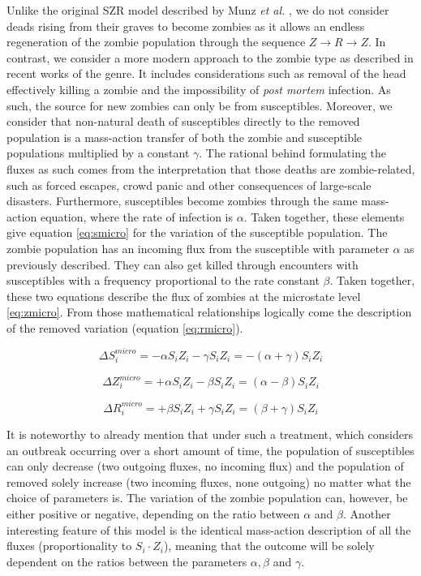\documentclass[11pt]{article} %
\begin{document}
Unlike the original SZR model described by Munz \textit{et al.} \cite{munz2009zombies}, we do not consider deads rising from their graves to become zombies as it allows an endless regeneration of the zombie population through the sequence $Z\rightarrow R\rightarrow Z$. In contrast, we consider a more modern approach to the zombie type as described in recent works of the genre. It includes considerations such as removal of the head effectively killing a zombie and the impossibility of \textit{post mortem} infection. As such, the source for new zombies can only be from susceptibles.  Moreover, we consider that non-natural death of susceptibles directly to the removed population is a mass-action transfer of both the zombie and susceptible populations multiplied by a constant $\gamma$. The rational behind formulating the fluxes as such comes from the interpretation that those deaths are zombie-related, such as forced escapes, crowd panic and other consequences of large-scale disasters. Furthermore, susceptibles become zombies through the same mass-action equation, where the rate of infection is $\alpha$. Taken together, these elements give equation \eqref{eq:smicro} for the variation of the susceptible population. The zombie population has an incoming flux from the susceptible with parameter $\alpha$ as previously described. They can also get killed through encounters with susceptibles with a frequency proportional to the rate constant $\beta$. Taken together, these two equations describe the flux of zombies at the microstate level \eqref{eq:zmicro}. From those mathematical relationships logically come the description of the removed variation (equation \eqref{eq:rmicro}). 

\begin{equation}  \label{eq:smicro}
\Delta S_{i}^{micro} = -\alpha S_{i} Z_{i} -\gamma S_{i} Z_{i} = -(\alpha + \gamma) S_{i} Z_{i}
\end{equation}

\begin{equation} \label{eq:zmicro}
\Delta Z_{i}^{micro} = +\alpha S_{i} Z_{i} - \beta S_{i} Z_{i} = (\alpha - \beta) S_{i} Z_{i}
\end{equation}

\begin{equation} \label{eq:rmicro}
\Delta R_{i}^{micro} = +\beta S_{i} Z_{i} + \gamma S_{i} Z_{i} = (\beta + \gamma) S_{i} Z_{i}
\end{equation}
\bigskip

It is noteworthy to already mention that under such a treatment, which considers an outbreak occurring over a short amount of time, the population of susceptibles can only decrease (two outgoing fluxes, no incoming flux) and the population of removed solely increase (two incoming fluxes, none outgoing) no matter what the choice of parameters is. The variation of the zombie population can, however, be either positive or negative, depending on the ratio between $\alpha$ and $\beta$. Another interesting feature of this model is the identical mass-action description of all the fluxes (proportionality to $S_{i} \cdot Z_{i}$), meaning that the outcome will be solely dependent on the ratios between the parameters $\alpha, \beta$ and $\gamma$.
\end{document}
